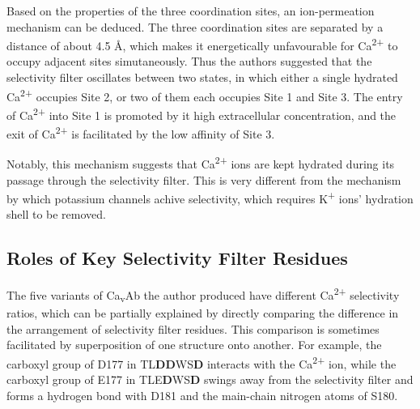 \documentclass[
]{article}
\begin{document}
Based on the properties of the three coordination sites, an ion-permeation mechanism can be deduced. The three coordination sites are separated by a distance of about 4.5 Å, which makes it energetically unfavourable for Ca\textsuperscript{2+} to occupy adjacent sites simutaneously. Thus the authors suggested that the selectivity filter oscillates between two states, in which either a single hydrated Ca\textsuperscript{2+} occupies Site 2, or two of them each occupies Site 1 and Site 3. The entry of Ca\textsuperscript{2+} into Site 1 is promoted by it high extracellular concentration, and the exit of Ca\textsuperscript{2+} is facilitated by the low affinity of Site 3.

Notably, this mechanism suggests that Ca\textsuperscript{2+} ions are kept hydrated during its passage through the selectivity filter. This is very different from the mechanism by which potassium channels achive selectivity, which requires K\textsuperscript{+} ions' hydration shell to be removed.

\hypertarget{roles-of-key-selectivity-filter-residues}{%
\subsection{Roles of Key Selectivity Filter Residues}\label{roles-of-key-selectivity-filter-residues}}

The five variants of Ca\textsubscript{v}Ab the author produced have different Ca\textsuperscript{2+} selectivity ratios, which can be partially explained by directly comparing the difference in the arrangement of selectivity filter residues. This comparison is sometimes facilitated by superposition of one structure onto another. For example, the carboxyl group of D177 in TL\textbf{DD}WS\textbf{D} interacts with the Ca\textsuperscript{2+} ion, while the carboxyl group of E177 in TLE\textbf{D}WS\textbf{D} swings away from the selectivity filter and forms a hydrogen bond with D181 and the main-chain nitrogen atoms of S180.
\end{document}
